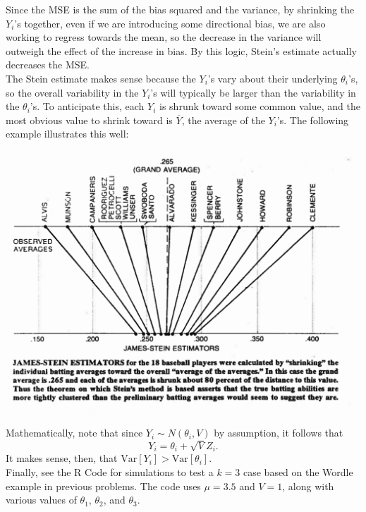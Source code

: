 \begin{enumerate}[a)]
    Since the MSE is the sum of the bias squared and the variance, by shrinking the $Y_i$'s together, even if we are introducing some directional bias, we are also working to regress towards the mean, so the decrease in the variance will outweigh the effect of the increase in bias. By this logic, Stein's estimate actually decreases the MSE. \\

    The Stein estimate makes sense because the $Y_i$'s vary about their underlying $\theta_i$'s, so the overall variability in
    the $Y_i$'s will typically be larger than the variability in the $\theta_i$'s. To anticipate this, each $Y_i$ is shrunk toward some common value, and the most obvious value to shrink toward is $\overline{Y} $, the average of the $Y_i$'s. 
    The following example illustrates this well:
    \begin{center}
        \includegraphics[scale=0.66]{week8_SteinsRegression.png}
    \end{center}

    Mathematically, note that since $Y_i \sim N(\theta_i, V)$ by assumption, it follows that
    \[
        Y_i = \theta_i + \sqrt{V}Z_i.
    \]
    It makes sense, then, that $\mathrm{Var} \left[Y_i \right] > \mathrm{Var} \left[\theta_i \right]$. \\

    Finally, see the R Code for simulations to test a $k=3$ case based on the Wordle example in previous problems. The code uses $\mu = 3.5$ and $V=1$, along with various values of $\theta_1$, $\theta_2$, and $\theta_3$. \\


\end{enumerate}
